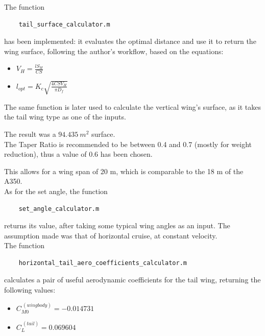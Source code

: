 \documentclass{article}
\begin{document}
 The function \autocite{Airbus_replacement_repo}

\begin{verbatim}
    tail_surface_calculator.m
\end{verbatim}

has been implemented: it evaluates the optimal distance and use it to return the wing surface, following the author's workflow,
based on the equations:

\begin{itemize}
    \item $V_H = \frac{lS_H}{CS}$
    \item $l_{opt} = K_c \sqrt{\frac{4CSV_H}{\pi D_f}}$
\end{itemize}

The same function is later used to calculate the vertical wing's surface, as it takes the tail wing type as one of the inputs.

The result was a $94.435 \ m^2$ surface. \\ 

The Taper Ratio is recommended to be between 0.4 and 0.7 (mostly for weight reduction), thus a value of 0.6 has been chosen.

This allows for a wing span of 20 m, which is comparable to the 18 m of the A350. \\ 

As for the set angle, the function \autocite{Airbus_replacement_repo}

\begin{verbatim}
    set_angle_calculator.m
\end{verbatim}

returns its value, after taking some typical wing angles as an input. The assumption made was that of horizontal
cruise, at constant velocity. \\ 

The function 

\begin{verbatim}
    horizontal_tail_aero_coefficients_calculator.m
\end{verbatim}

calculates a pair of useful aerodynamic coefficients for the tail wing, returning the following values:

\begin{itemize}
    \item ${C_{M0}^{\ (wing body)} = -0.014731} $
    \item ${C_{L}^{\ (tail)}} = 0.069604$
\end{itemize}
\end{document}
